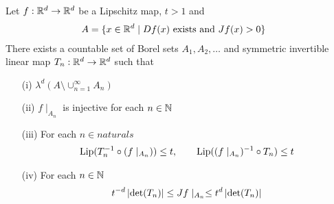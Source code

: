 \begin{lem}\label{CoareaFormulaLipschitz:FunctionBounds}Let $f : \mathbb{R}^d \to \mathbb{R}^d$ be a Lipschitz map, $t>1$ and
\begin{align*}
A &= \lbrace x \in \mathbb{R}^d \mid Df(x) \text{ exists and } Jf(x) > 0\rbrace
\end{align*}
There exists a countable set of Borel sets $A_1, A_2, \dotsc$ and symmetric invertible linear map $T_n : \mathbb{R}^d \to \mathbb{R}^d$ such that 
\begin{itemize}
\item[(i)] $\lambda^d(A \setminus \cup_{n=1}^\infty A_n)$
\item[(ii)] $f \mid_{A_n}$ is injective for each $n \in \mathbb{N}$
\item[(iii)] For each $n \in naturals$
\begin{align}\label{eq:CoareaFormulaLipschitz:LipschitzConstants}
\operatorname*{Lip}( T_n^{-1} \circ (f \mid_{A_n})) \leq t, \qquad \operatorname*{Lip}((f
  \mid_{A_n})^{-1} \circ T_n) \leq t
\end{align}
\item[(iv)] For each $n \in \mathbb{N}$
\begin{align}\label{eq:CoareaFormulaLipschitz:JacobianBounds}
t^{-d} \left \vert \det(T_n) \right \vert \leq Jf\mid_{A_n} \leq t^{d} \left \vert \det(T_n) \right \vert 
\end{align}
\end{itemize}
\end{lem}
